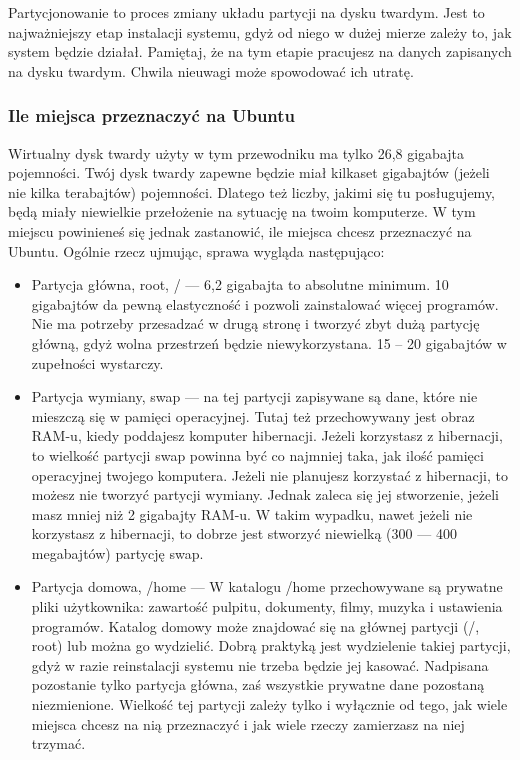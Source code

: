 \label{subsec:partycjonowanie}
Partycjonowanie to proces zmiany układu partycji na dysku twardym. Jest to najważniejszy etap instalacji systemu, gdyż od niego w dużej mierze zależy to, jak system będzie działał. Pamiętaj, że na tym etapie pracujesz na danych zapisanych na dysku twardym. Chwila nieuwagi może spowodować ich utratę.
\subsubsection{Ile miejsca przeznaczyć na Ubuntu}
\label{ile_miejsca}
Wirtualny dysk twardy użyty w tym przewodniku ma tylko 26,8 gigabajta pojemności. Twój dysk twardy zapewne będzie miał kilkaset gigabajtów (jeżeli nie kilka terabajtów) pojemności. Dlatego też liczby, jakimi się tu posługujemy, będą miały niewielkie przełożenie na sytuację na twoim komputerze. W tym miejscu powinieneś się jednak zastanowić, ile miejsca chcesz przeznaczyć na Ubuntu.
Ogólnie rzecz ujmując, sprawa wygląda następująco:
\begin{itemize}
\item \textcolor{ubuntu_orange}{Partycja główna, root, /} --- 6,2 gigabajta to absolutne minimum. 10 gigabajtów da pewną elastyczność i pozwoli zainstalować więcej programów. Nie ma potrzeby przesadzać w drugą stronę i tworzyć zbyt dużą partycję główną, gdyż wolna przestrzeń będzie niewykorzystana. 15 -- 20 gigabajtów w zupełności wystarczy.
\item \textcolor{ubuntu_orange}{Partycja wymiany, swap} --- na tej partycji zapisywane są dane, które nie mieszczą się w pamięci operacyjnej. Tutaj też przechowywany jest obraz RAM-u, kiedy poddajesz komputer hibernacji. Jeżeli korzystasz z hibernacji, to wielkość partycji swap powinna być co najmniej taka, jak ilość pamięci operacyjnej twojego komputera. Jeżeli nie planujesz korzystać z hibernacji, to możesz nie tworzyć partycji wymiany. Jednak zaleca się jej stworzenie, jeżeli masz mniej niż 2 gigabajty RAM-u. W takim wypadku, nawet jeżeli nie korzystasz z hibernacji, to dobrze jest stworzyć niewielką (300 --- 400 megabajtów) partycję swap.
\item \textcolor{ubuntu_orange}{Partycja domowa, /home} --- W katalogu /home przechowywane są prywatne pliki użytkownika: zawartość pulpitu, dokumenty, filmy, muzyka i ustawienia programów. Katalog domowy może znajdować się na głównej partycji (/, root) lub można go wydzielić. Dobrą praktyką jest wydzielenie takiej partycji, gdyż w razie reinstalacji systemu nie trzeba będzie jej kasować. Nadpisana pozostanie tylko partycja główna, zaś wszystkie prywatne dane pozostaną niezmienione. Wielkość tej partycji zależy tylko i wyłącznie od tego, jak wiele miejsca chcesz na nią przeznaczyć i jak wiele rzeczy zamierzasz na niej trzymać. 
\end{itemize}
\clearpage
